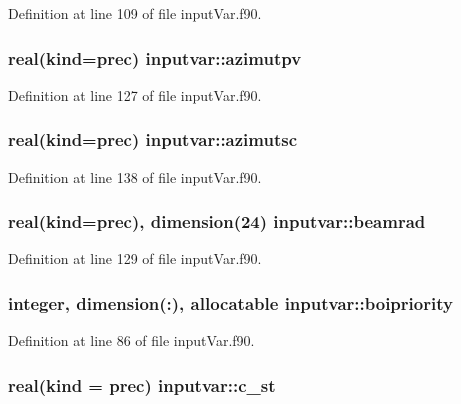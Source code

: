 Definition at line 109 of file input\-Var.\-f90.

\hypertarget{classinputvar_ae36a6ce527f47c090cf19f733d28b6d7}{
\subsubsection[{azimutpv}]{\setlength{\rightskip}{0pt plus 5cm}real(kind=prec) inputvar\-::azimutpv}}\label{classinputvar_ae36a6ce527f47c090cf19f733d28b6d7}


Definition at line 127 of file input\-Var.\-f90.

\hypertarget{classinputvar_a55e23291eb7d5495b50199caabe3e529}{
\subsubsection[{azimutsc}]{\setlength{\rightskip}{0pt plus 5cm}real(kind=prec) inputvar\-::azimutsc}}\label{classinputvar_a55e23291eb7d5495b50199caabe3e529}


Definition at line 138 of file input\-Var.\-f90.

\hypertarget{classinputvar_a32edbf52e3022964fd59a2a4d76a6b6d}{
\subsubsection[{beamrad}]{\setlength{\rightskip}{0pt plus 5cm}real(kind=prec), dimension(24) inputvar\-::beamrad}}\label{classinputvar_a32edbf52e3022964fd59a2a4d76a6b6d}


Definition at line 129 of file input\-Var.\-f90.

\hypertarget{classinputvar_a87efe639d66848f1a52e1c265e175e2c}{
\subsubsection[{boipriority}]{\setlength{\rightskip}{0pt plus 5cm}integer, dimension(\-:), allocatable inputvar\-::boipriority}}\label{classinputvar_a87efe639d66848f1a52e1c265e175e2c}


Definition at line 86 of file input\-Var.\-f90.

\hypertarget{classinputvar_afe1c70c120d3938f07fa818f015ad52d}{
\subsubsection[{c\-\_\-st}]{\setlength{\rightskip}{0pt plus 5cm}real(kind = prec) inputvar\-::c\-\_\-st}}\label{classinputvar_afe1c70c120d3938f07fa818f015ad52d}


